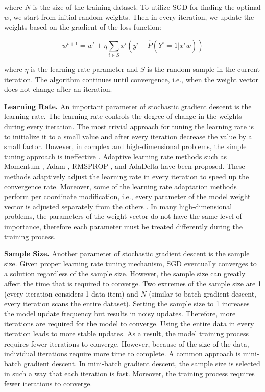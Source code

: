 where $N$ is the size of the training dataset.
To utilize SGD for finding the optimal $w$, we start from initial random weights.
Then in every iteration, we update the weights based on the gradient of the loss function:

\begin{center}
$${w}^{t+1} = {w}^t + \eta \sum_{i \in S} x^i (y^i - \hat{P}(Y^i = 1 | x^i w))$$
\end{center}

where $\eta$ is the learning rate parameter and $S$ is the random sample in the current iteration.
The algorithm continues until convergence, i.e., when the weight vector does not change after an iteration.

\textbf{Learning Rate.}
An important parameter of stochastic gradient descent is the learning rate.
The learning rate controls the degree of change in the weights during every iteration.
The most trivial approach for tuning the learning rate is to initialize it to a small value and after every iteration decrease the value by a small factor.
However, in complex and high-dimensional problems, the simple tuning approach is ineffective \cite{schaul2013no}. 
Adaptive learning rate methods such as Momentum \cite{qian1999momentum}, Adam \cite{kingma2014adam}, RMSPROP \cite{tieleman2012lecture}, and AdaDelta \cite{zeiler2012adadelta} have been proposed.
These methods adaptively adjust the learning rate in every iteration to speed up the convergence rate.
Moreover, some of the learning rate adaptation methods perform per coordinate modification, i.e., every parameter of the model weight vector is adjusted separately from the others \cite{kingma2014adam, tieleman2012lecture, zeiler2012adadelta}. 
In many high-dimensional problems, the parameters of the weight vector do not have the same level of importance, therefore each parameter must be treated differently during the training process.

\textbf{Sample Size.}
Another parameter of stochastic gradient descent is the sample size.
Given proper learning rate tuning mechanism, SGD eventually converges to a solution regardless of the sample size.
However, the sample size can greatly affect the time that is required to converge.
Two extremes of the sample size are 1 (every iteration considers 1 data item) and $N$ (similar to batch gradient descent, every iteration scans the entire dataset).
Setting the sample size to 1 increases the model update frequency but results in noisy updates.
Therefore, more iterations are required for the model to converge.
Using the entire data in every iteration leads to more stable updates.
As a result, the model training process requires fewer iterations to converge.
However, because of the size of the data, individual iterations require more time to complete.
A common approach is mini-batch gradient descent.
In mini-batch gradient descent, the sample size is selected in such a way that each iteration is fast.
Moreover, the training process requires fewer iterations to converge.


